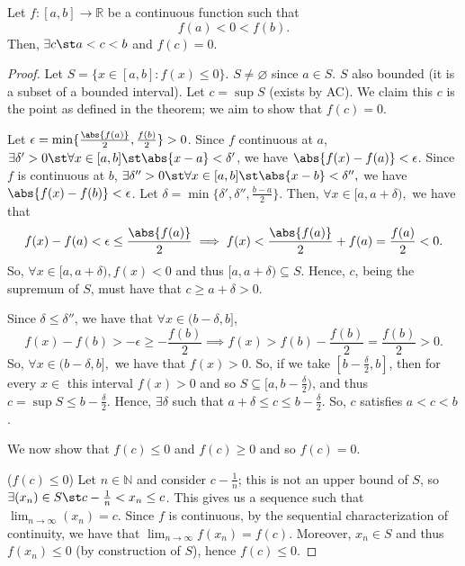 \documentclass[12pt]{article}
\begin{document}
\begin{theorem}\label{thm:locationoftheroots}
    Let $f:[a, b] \to \mathbb{R}$ be a continuous function such that $$
    f(a) < 0 < f(b).
    $$
    Then, $\exists c \st a < c < b$ and $f(c) = 0$.
\end{theorem}
\begin{proof}
  Let $S = \{x \in [a, b] : f(x) \leq 0\}$. $S \neq \varnothing$ since $a \in S$. $S$ also bounded (it is a subset of a bounded interval). Let $c = \sup S$ (exists by AC). We claim this $c$ is the point as defined in the theorem; we aim to show that $f(c) = 0$.

  Let $\epsilon = \min \{\frac{\abs{f(a)}}{2}, \frac{f(b)}{2}\} > 0$. Since $f$ continuous at $a$, $\exists \delta' > 0 \st \forall x \in [a, b] \st \abs{x - a} < \delta'$, we have $\abs{f(x) - f(a)} < \epsilon$. Since $f$ is continuous at $b$, $\exists \delta'' > 0 \st \forall x \in [a, b] \st \abs{x - b} < \delta'',$ we have $\abs{f(x) - f(b)} < \epsilon$. Let $\delta = \min \{\delta', \delta'', \frac{b -a}{2}\}$. Then, $\forall x \in [a, a+ \delta),$ we have that \[
  f(x) - f(a) < \epsilon \leq \frac{\abs{f(a)}}{2} \implies f(x) < \frac{\abs{f(a)}}{2} + f(a) = \frac{f(a)}{2} < 0.
  \]
  So, $\forall x \in [a, a + \delta), f(x) < 0$ and thus $[a, a + \delta) \subseteq S$. Hence, $c$, being the supremum of $S$, must have that $c \geq a + \delta > 0$.

  Since $\delta \leq \delta''$, we have that $\forall x \in (b - \delta, b]$, \[
  f(x) - f(b) > - \epsilon \geq -\frac{f(b)}{2} \implies f(x) > f(b) - \frac{f(b)}{2} = \frac{f(b)}{2} > 0.
  \]
  So, $\forall x \in (b - \delta, b],$ we have that $f(x) > 0$. So, if we take $[b - \frac{\delta}{2},  b]$, then for every $x \in$ this interval $f(x) > 0$ and so $S \subseteq [a, b - \frac{\delta}{2})$, and thus $c = \sup S \leq b - \frac{\delta}{2}$. Hence, $\exists \delta$ such that $a + \delta \leq c \leq b - \frac{\delta}{2}$. So, $c$ satisfies $a < c < b$.

  We now show that $f(c) \leq 0$ and $f(c) \geq 0$ and so $f(c) = 0$.
  
  \noindent($f(c) \leq 0$) Let $n \in \mathbb{N}$ and consider $c - \frac{1}{n}$; this is not an upper bound of $S$, so $\exists (x_n) \in S \st c - \frac{1}{n} < x_n \leq c$. This gives us a sequence such that $\lim_{n\to\infty} (x_n) = c$. Since $f$ is continuous, by the sequential characterization of continuity, we have that $\lim_{n\to\infty} f(x_n) = f(c)$. Moreover, $x_n \in S$ and thus $f(x_n)\leq 0$ (by construction of $S$), hence $f(c) \leq 0$.


\end{proof}
\end{document}
